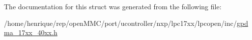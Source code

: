 The documentation for this struct was generated from the following file\-:\begin{DoxyCompactItemize}
\item 
/home/henrique/rep/open\-M\-M\-C/port/ucontroller/nxp/lpc17xx/lpcopen/inc/\hyperlink{gpdma__17xx__40xx_8h}{gpdma\-\_\-17xx\-\_\-40xx.\-h}\end{DoxyCompactItemize}
